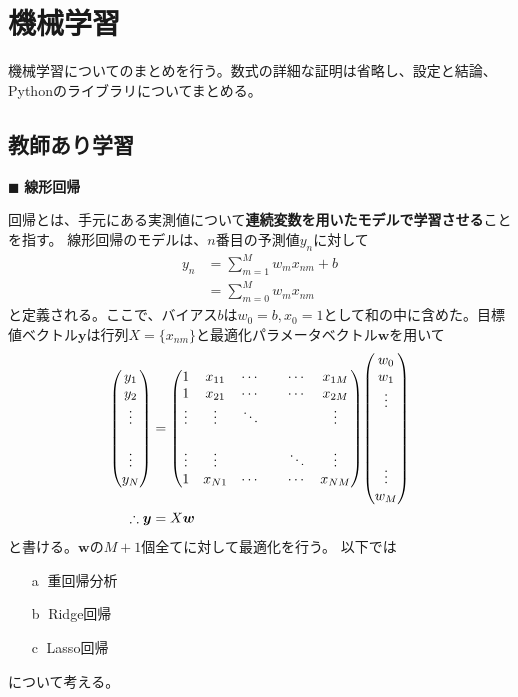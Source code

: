 \documentclass[uplatex,12pt,dvipdfmx]{jsarticle}
\begin{document}
\setcounter{section}{0}
\setcounter{subsection}{0}

\section{機械学習}

機械学習についてのまとめを行う。数式の詳細な証明は省略し、設定と結論、Pythonのライブラリについてまとめる。

\subsection{教師あり学習}

\noindent$\blacksquare$ \textbf{線形回帰}

回帰とは、手元にある実測値について\textbf{連続変数を用いたモデルで学習させる}ことを指す。
線形回帰のモデルは、$n$番目の予測値$y_{n}$に対して
\begin{align}
    y_n&=\sum_{m=1}^{M}w_{m}x_{nm}+b \\
    &=\sum_{m=0}^{M}w_{m}x_{nm}
\end{align}
と定義される。ここで、バイアス$b$は$w_0=b,x_0=1$として和の中に含めた。目標値ベクトル$\bm{y}$は行列$X=\{x_{nm}\}$と最適化パラメータベクトル$\bm{w}$を用いて
\begin{align}
    \mqty(
            y_1 \\ y_2 \\ \vdots \\ \\ \vdots \\ y_N
        )&=\mqty(
        1 & x_{11} & \cdots & & \cdots & x_{1M} \\
        1 & x_{21} & \cdots & & \cdots & x_{2M} \\
        \vdots & \vdots & \ddots & &        & \vdots \\
                &        &        & &        &        \\
        \vdots & \vdots &        & & \ddots & \vdots \\
        1 & x_{N1} & \cdots & & \cdots & x_{NM})\mqty(
            w_0 \\ w_1 \\ \vdots \\ \\ \\ \\ \vdots \\ w_M
        ) \\
    \label{y=wx}\therefore\bm{y}&=X\bm{w}
\end{align}
と書ける。$\bm{w}$の$M+1$個全てに対して最適化を行う。
以下では
\begin{itemize}
    \item [\textcircled{a}]重回帰分析
    \item [\textcircled{b}]Ridge回帰
    \item [\textcircled{c}]Lasso回帰
\end{itemize}
について考える。
\end{document}
